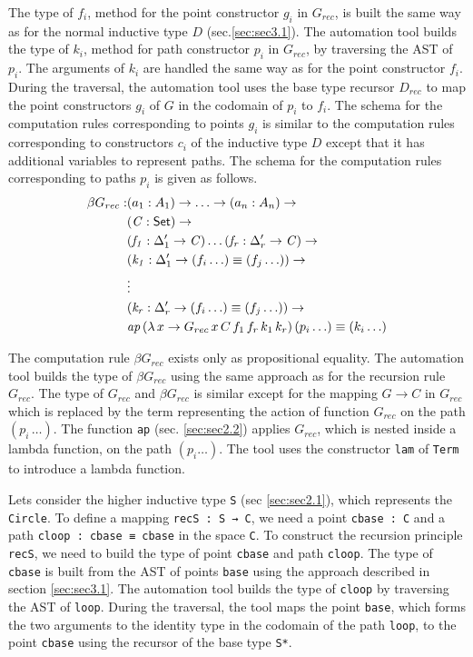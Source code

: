 \documentclass[sigplan,10pt]{acmart}
\begin{document}
The type of $f_i$, method for the point constructor $g_i$ in $G_{rec}$, is built the same way as for the normal inductive type $D$ (sec.\ref{sec:sec3.1}). The automation tool builds the type of $k_i$, method for path constructor $p_i$ in $G_{rec}$, by traversing the AST of $p_i$. The arguments of $k_i$ are handled the same way as for the point constructor $f_i$. During the traversal, the automation tool uses the base type recursor $D_{rec}$ to map the point constructors $g_i$ of $G$ in the codomain of $p_i$ to $f_i$. The schema for the computation rules corresponding to points $g_i$ is similar to the computation rules corresponding to constructors $c_i$ of the inductive type $D$ except that it has additional variables to represent paths. The schema for the computation rules corresponding to paths $p_i$ is given as follows.
\begin{align*}
\beta G_{rec} :  & (a_1 : A_1) \to \ldots \to (a_n : A_n) \to\\
& (\mathit{C} : \textsf{Set}{}) \to \\
& (\mathit{f_1} : \Delta_1^\prime \to \mathit{C}) \ldots (\mathit{f_r} : \Delta_r^\prime \to \mathit{C}) \to \\
& (\mathit{k_1} : \Delta_1^\prime \to (f_i \ldots) \equiv (f_j \ldots)) \to \\
& \vdots \\
& (\mathit{k_r} : \Delta_r^\prime \to (f_i \ldots) \equiv (f_j \ldots)) \to \\
& \mathit{ap} \, (\lambda \, x \to G_{rec} \, x \, C \, f_1 \, f_r \, k_1 \, k_r) \, (p_i \ldots) \equiv (k_i \ldots)
\end{align*}

The computation rule $\beta G_{rec}$ exists only as propositional equality. The automation tool builds the type of $\beta G_{rec}$ using the same approach as for the recursion rule $G_{rec}$. The type of $G_{rec}$ and $\beta G_{rec}$ is similar except for the mapping $G \to C$ in $G_{rec}$ which is replaced by the term representing the action of function $G_{rec}$ on the path $(p_i \, \ldots)$. The function {\tt ap} (sec. \ref{sec:sec2.2}) applies $G_{rec}$, which is nested inside a lambda function, on the path $(p_i \ldots)$. The tool uses the constructor {\tt lam} of {\tt Term} to introduce a lambda function.

Lets consider the higher inductive type {\tt S} (sec \ref{sec:sec2.1}), which represents the {\tt Circle}. To define a mapping {\tt recS : S → C}, we need a point {\tt cbase : C} and a path {\tt cloop : cbase ≡ cbase} in the space {\tt C}. To construct the recursion principle {\tt recS}, we need to build the type of point {\tt cbase} and path {\tt cloop}. The type of {\tt cbase} is built from the AST of points {\tt base} using the approach described in section \ref{sec:sec3.1}. The automation tool builds the type of {\tt cloop} by traversing the AST of {\tt loop}. During the traversal, the tool maps the point {\tt base}, which forms the two arguments to the identity type in the codomain of the path {\tt loop}, to the point {\tt cbase} using the recursor of the base type {\tt S*}.
\end{document}
